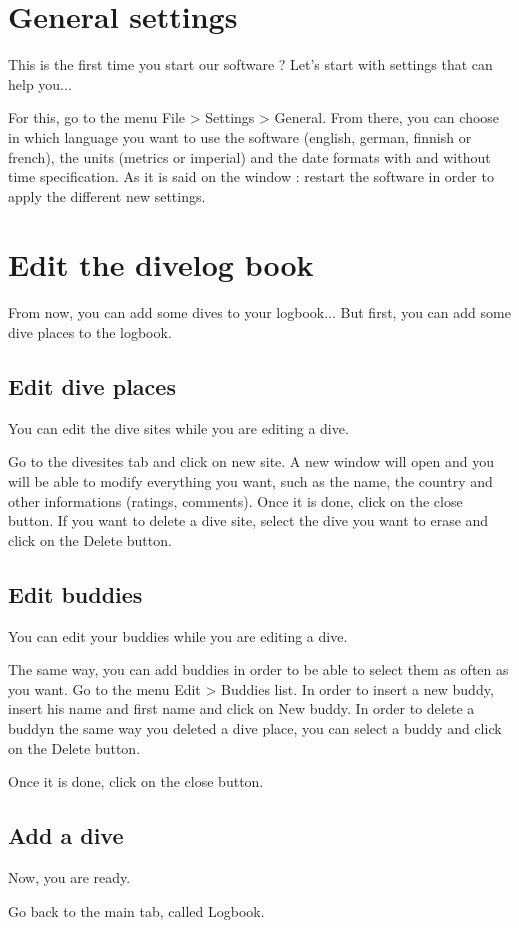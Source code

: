 \documentclass[10pt,a4paper,titlepage]{report}
\begin{document}
\chapter{General settings}
This is the first time you start our software ? Let's start with settings that can help you...

For this, go to the menu File > Settings > General.
From there, you can choose in which language you want to use the software (english, german, finnish or french), the units (metrics or imperial) and the date formats with and without time specification.
As it is said on the window : restart the software in order to apply the different new settings.\chapter{Edit the divelog  book}
From now, you can add some dives to your logbook... But first, you can add some dive places to the logbook. \section{Edit dive places}
You can edit the dive sites while you are editing a dive.

Go to the divesites tab and click on new site. A new window will open and you will be able to modify everything you want, such as the name, the country and other informations (ratings, comments). Once it is done, click on the close button.
If you want to delete a dive site, select the dive you want to erase and click on the Delete button.
\section{Edit buddies}
You can edit your buddies while you are editing a dive.

The same way, you can add buddies in order to be able to select them as often as you want.
Go to the menu Edit > Buddies list.
In order to insert a new buddy, insert his name and first name and click on New buddy.
In order to delete a buddyn the same way you deleted a dive place, you can select a buddy and click on the Delete button.

Once it is done, click on the close button.
\section {Add a dive}
Now, you are ready.

Go back to the main tab, called Logbook.
\end{document}
